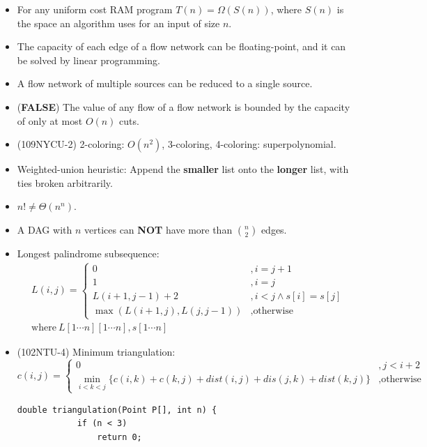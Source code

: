 \begin{itemize}
    \item For any uniform cost RAM program $T(n) = \Omega(S(n))$, where $S(n)$ is the space an algorithm uses for an input of size $n$.
    \item The capacity of each edge of a flow network can be floating-point, and it can be solved by linear programming.
    \item A flow network of multiple sources can be reduced to a single source.
    \item (\textbf{FALSE}) The value of any flow of a flow network is bounded by the capacity of only at most $O(n)$ cuts.
    \item (109NYCU-2) 2-coloring: $O(n^2)$, 3-coloring, 4-coloring: superpolynomial.
    \item Weighted-union heuristic: Append the \textbf{smaller} list onto the \textbf{longer} list, with ties broken arbitrarily.
    \item $n! \neq \Theta(n^n)$.
    \item A DAG with $n$ vertices can \textbf{NOT} have more than $\binom{n}{2}$ edges.
    \item Longest palindrome subsequence: \begin{equation}
        \begin{aligned}
            & L(i, j) = \begin{cases}
                0 &, i = j + 1 \\
                1 &, i = j \\
                L(i + 1, j - 1) + 2 &, i < j \land s[i] = s[j] \\
                \max(L(i + 1, j), L(j, j - 1)) &, \text{otherwise}
            \end{cases} \\
            & \text{where} \ L[1 \cdots n][1 \cdots n], s[1 \cdots n]
        \end{aligned}
    \end{equation}
    \item (102NTU-4) Minimum triangulation: \begin{equation}
        c(i, j) = \begin{cases}
            0 &, j < i + 2 \\
            \min\limits_{i < k < j}\{c(i, k) + c(k, j) + dist(i, j) + dis(j, k) + dist(k, j)\} &, \text{otherwise}
        \end{cases}
    \end{equation} \begin{lstlisting}[caption={Minimum triangulation.}, captionpos=b]
        double triangulation(Point P[], int n) {
            if (n < 3)
                return 0;
            

\end{lstlisting}
\end{itemize}
